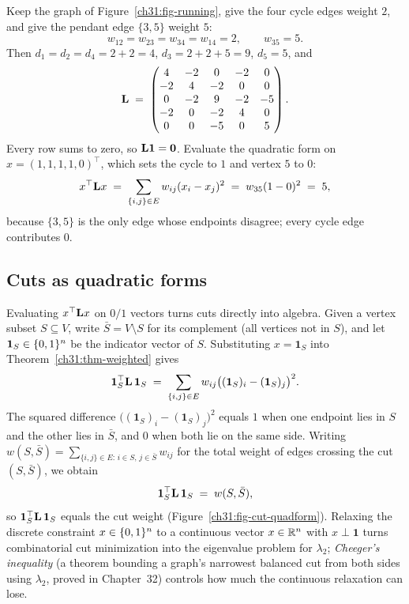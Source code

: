 \begin{example}\label{ch31:ex-weighted}
Keep the graph of Figure~\ref{ch31:fig-running}, give the four cycle edges weight $2$, and give the pendant edge $\{3,5\}$ weight $5$:
\[
  w_{12}=w_{23}=w_{34}=w_{14}=2,\qquad w_{35}=5.
\]
Then $d_1=d_2=d_4 = 2+2 = 4$, $d_3 = 2+2+5 = 9$, $d_5 = 5$, and
\[
  \mathbf{L} \;=\;
  \begin{pmatrix}
     4 & -2 &  0 & -2 &  0\\
    -2 &  4 & -2 &  0 &  0\\
     0 & -2 &  9 & -2 & -5\\
    -2 &  0 & -2 &  4 &  0\\
     0 &  0 & -5 &  0 &  5
  \end{pmatrix}.
\]
Every row sums to zero, so $\mathbf{L}\mathbf{1}=\mathbf{0}$. Evaluate the quadratic form on $x = (1,1,1,1,0)^\top$, which sets the cycle to $1$ and vertex $5$ to $0$:
\[
  x^\top \mathbf{L} x \;=\; \sum_{\{i,j\}\in E} w_{ij}(x_i-x_j)^2 \;=\; w_{35}(1-0)^2 \;=\; 5,
\]
because $\{3,5\}$ is the only edge whose endpoints disagree; every cycle edge contributes $0$.
\end{example}

\subsection{Cuts as quadratic forms}

Evaluating $x^\top \mathbf{L} x$ on $0/1$ vectors turns cuts directly into algebra. Given a vertex subset $S\subseteq V$, write $\bar S = V\setminus S$ for its complement (all vertices not in $S$), and let $\mathbf{1}_S \in \{0,1\}^n$ be the indicator vector of $S$. Substituting $x = \mathbf{1}_S$ into Theorem~\ref{ch31:thm-weighted} gives
\[
  \mathbf{1}_S^\top \mathbf{L}\, \mathbf{1}_S
  \;=\; \sum_{\{i,j\}\in E} w_{ij}\bigl((\mathbf{1}_S)_i - (\mathbf{1}_S)_j\bigr)^2 .
\]
The squared difference $\bigl((\mathbf{1}_S)_i - (\mathbf{1}_S)_j\bigr)^2$ equals $1$ when one endpoint lies in $S$ and the other lies in $\bar S$, and $0$ when both lie on the same side. Writing $w(S,\bar S) = \sum_{\{i,j\}\in E:\, i\in S,\, j\in\bar S} w_{ij}$ for the total weight of edges crossing the cut $(S,\bar S)$, we obtain
\[
  \mathbf{1}_S^\top \mathbf{L}\, \mathbf{1}_S \;=\; w(S,\bar S),
\]
so $\mathbf{1}_S^\top \mathbf{L}\, \mathbf{1}_S$ equals the cut weight (Figure~\ref{ch31:fig-cut-quadform}). Relaxing the discrete constraint $x \in \{0,1\}^n$ to a continuous vector $x \in \mathbb{R}^n$ with $x\perp\mathbf{1}$ turns combinatorial cut minimization into the eigenvalue problem for $\lambda_2$; \emph{Cheeger's inequality} (a theorem bounding a graph's narrowest balanced cut from both sides using $\lambda_2$, proved in Chapter~32) controls how much the continuous relaxation can lose.

